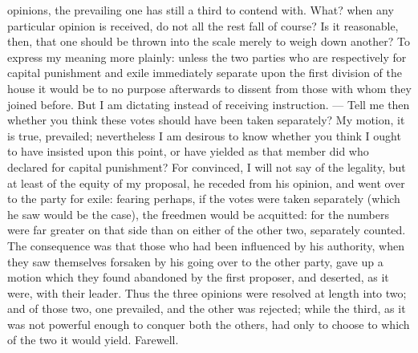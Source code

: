 opinions, the prevailing one has still a third to contend with. What? when
any particular opinion is received, do not all the rest fall of course? Is
it reasonable, then, that one should be thrown into the scale merely to
weigh down another? To express my meaning more plainly: unless the two
parties who are respectively for capital punishment and exile immediately
separate upon the first division of the house it would be to no purpose
afterwards to dissent from those with whom they joined before. But I am
dictating instead of receiving instruction. — Tell me then whether
you think these votes should have been taken separately? My motion, it is
true, prevailed; nevertheless I am desirous to know whether you think I
ought to have insisted upon this point, or have yielded as that member did
who declared for capital punishment? For convinced, I will not say of the
legality, but at least of the equity of my proposal, he receded from his
opinion, and went over to the party for exile: fearing perhaps, if the
votes were taken separately (which he saw would be the case), the freedmen
would be acquitted: for the numbers were far greater on that side than on
either of the other two, separately counted. The consequence was that
those who had been influenced by his authority, when they saw themselves
forsaken by his going over to the other party, gave up a motion which they
found abandoned by the first proposer, and deserted, as it were, with
their leader. Thus the three opinions were resolved at length into two;
and of those two, one prevailed, and the other was rejected; while the
third, as it was not powerful enough to conquer both the others, had only
to choose to which of the two it would yield. Farewell.


